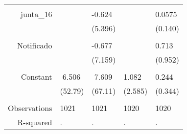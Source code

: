 \begin{tabular}{rrrrr}
      & \multicolumn{1}{l}{} & \multicolumn{1}{l}{} & \multicolumn{1}{l}{} & \multicolumn{1}{l}{} \\
junta\_16 & \multicolumn{1}{l}{} & \multicolumn{1}{l}{-0.624} & \multicolumn{1}{l}{} & \multicolumn{1}{l}{0.0575} \\
      & \multicolumn{1}{l}{} & \multicolumn{1}{l}{(5.396)} & \multicolumn{1}{l}{} & \multicolumn{1}{l}{(0.140)} \\
      & \multicolumn{1}{l}{} & \multicolumn{1}{l}{} & \multicolumn{1}{l}{} & \multicolumn{1}{l}{} \\
Notificado & \multicolumn{1}{l}{} & \multicolumn{1}{l}{-0.677} & \multicolumn{1}{l}{} & \multicolumn{1}{l}{0.713} \\
      & \multicolumn{1}{l}{} & \multicolumn{1}{l}{(7.159)} & \multicolumn{1}{l}{} & \multicolumn{1}{l}{(0.952)} \\
      & \multicolumn{1}{l}{} & \multicolumn{1}{l}{} & \multicolumn{1}{l}{} & \multicolumn{1}{l}{} \\
Constant & \multicolumn{1}{l}{-6.506} & \multicolumn{1}{l}{-7.609} & \multicolumn{1}{l}{1.082} & \multicolumn{1}{l}{0.244} \\
      & \multicolumn{1}{l}{(52.79)} & \multicolumn{1}{l}{(67.11)} & \multicolumn{1}{l}{(2.585)} & \multicolumn{1}{l}{(0.344)} \\
      & \multicolumn{1}{l}{} & \multicolumn{1}{l}{} & \multicolumn{1}{l}{} & \multicolumn{1}{l}{} \\
Observations & \multicolumn{1}{l}{1021} & \multicolumn{1}{l}{1021} & \multicolumn{1}{l}{1020} & \multicolumn{1}{l}{1020} \\
R-squared & \multicolumn{1}{l}{.} & \multicolumn{1}{l}{.} & \multicolumn{1}{l}{.} & \multicolumn{1}{l}{.} \\
\bottomrule
\end{tabular}%
